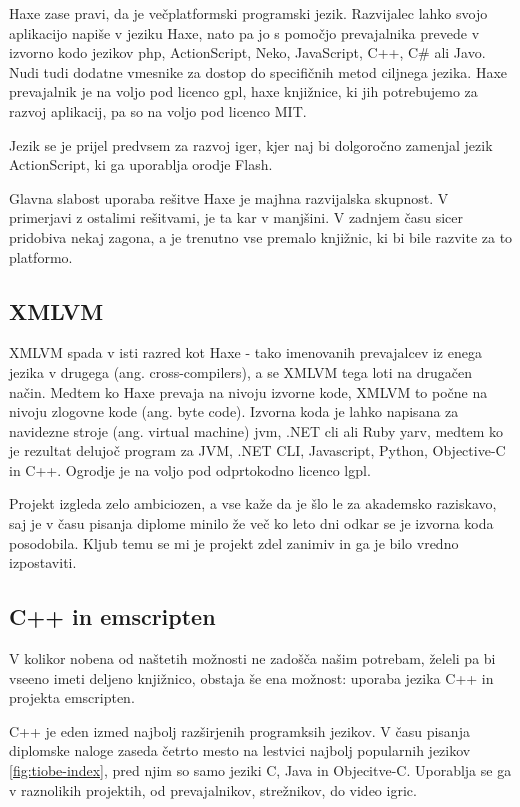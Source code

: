 Haxe\cite{haxe} zase pravi, da je večplatformski programski jezik. Razvijalec lahko svojo aplikacijo napiše v jeziku Haxe, nato pa jo s pomočjo prevajalnika prevede v izvorno kodo jezikov \gls{php}, ActionScript, Neko, JavaScript, C++, C\# ali Javo. Nudi tudi dodatne vmesnike za dostop do specifičnih metod ciljnega jezika. Haxe prevajalnik je na voljo pod licenco \gls{gpl}, haxe knjižnice, ki jih potrebujemo za razvoj aplikacij, pa so na voljo pod licenco MIT.

Jezik se je prijel predvsem za razvoj iger, kjer naj bi dolgoročno zamenjal jezik ActionScript, ki ga uporablja orodje Flash.

Glavna slabost uporaba rešitve Haxe je majhna razvijalska skupnost. V primerjavi z ostalimi rešitvami, je ta kar v manjšini. V zadnjem času sicer pridobiva nekaj zagona, a je trenutno vse premalo knjižnic, ki bi bile razvite za to platformo.

\subsection{XMLVM}

XMLVM\cite{xmlvm} spada v isti razred kot Haxe - tako imenovanih prevajalcev iz enega jezika v drugega (ang. cross-compilers), a se XMLVM tega loti na drugačen način. Medtem ko Haxe prevaja na nivoju izvorne kode, XMLVM to počne na nivoju zlogovne kode (ang. byte code). Izvorna koda je lahko napisana za navidezne stroje (ang. virtual machine) \gls{jvm}, .NET \gls{cli} ali Ruby \gls{yarv}, medtem ko je rezultat delujoč program za JVM, .NET CLI, Javascript, Python, Objective-C in C++. Ogrodje je na voljo pod odprtokodno licenco \gls{lgpl}.

Projekt izgleda zelo ambiciozen, a vse kaže da je šlo le za akademsko raziskavo, saj je v času pisanja diplome minilo že več ko leto dni odkar se je izvorna koda posodobila. Kljub temu se mi je projekt zdel zanimiv in ga je bilo vredno izpostaviti.

\subsection{C++ in emscripten}

V kolikor nobena od naštetih možnosti ne zadošča našim potrebam, želeli pa bi vseeno imeti deljeno knjižnico, obstaja še ena možnost: uporaba jezika C++\cite{cpp} in projekta emscripten\cite{emscripten}.

C++ je eden izmed najbolj razširjenih programksih jezikov. V času pisanja diplomske naloge zaseda četrto mesto na lestvici najbolj popularnih jezikov \ref{fig:tiobe-index}, pred njim so samo jeziki C, Java in Objecitve-C. Uporablja se ga v raznolikih projektih, od prevajalnikov, strežnikov, do video igric.

